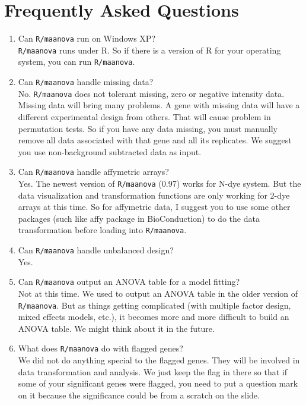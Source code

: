 \newpage
\section{Frequently Asked Questions}

\begin{enumerate}
\item Can {\tt R/maanova} run on Windows XP?\\
{\tt R/maanova} runs under R. So if there is a version of R
for your operating system, you can run {\tt R/maanova}.

\item Can {\tt R/maanova} handle missing data?\\
No. {\tt R/maanova} does not tolerant missing, zero or negative
intensity data. Missing data will bring many problems.
A gene with missing data will have a different
experimental design from others. That will cause problem
in permutation tests. So if you have any data missing, you must
manually remove all data associated with that gene
and all its replicates. We suggest you use non-background
subtracted data as input.

\item Can {\tt R/maanova} handle affymetric arrays?\\
Yes. The newest version of {\tt R/maanova} (0.97) works for
N-dye system. But the data visualization and transformation
functions are only working for 2-dye arrays at this time.
So for affymetric data, I suggest you to use some other
packages (such like affy package in BioConduction)
to do the data transformation before loading into {\tt R/maanova}.

\item Can {\tt R/maanova} handle unbalanced design?\\
Yes.

\item Can {\tt R/maanova} output an ANOVA table for a model fitting?\\
Not at this time. We used to output an ANOVA table in the
older version of {\tt R/maanova}. But
as things getting complicated (with multiple factor design,
mixed effects models, etc.), it becomes more and more
difficult to build an ANOVA table. We might think about it
in the future.

\item What does {\tt R/maanova} do with flagged genes?\\
We did not do anything special to the flagged genes.
They will be involved in data transformation and analysis.
We just keep the flag in there so that if some of your
significant genes were flagged, you need to put a
question mark on it because the significance could
be from a scratch on the slide.


\end{enumerate}
